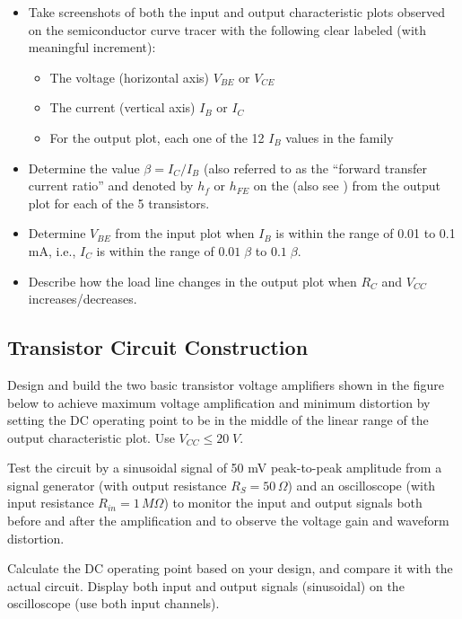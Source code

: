 \begin{itemize}
\item Take screenshots of both the input and output characteristic plots 
  observed on the semiconductor curve tracer with the following clear 
  labeled (with meaningful increment):
  \begin{itemize}
  \item The voltage (horizontal axis) $V_{BE}$ or $V_{CE}$
  \item The current (vertical axis) $I_B$ or $I_C$
  \item For the output plot, each one of the 12 $I_B$ values in the family
  \end{itemize}
\item Determine the value $\beta=I_C/I_B$ (also referred to as the 
  ``forward transfer current ratio'' and denoted by $h_f$ or $h_{FE}$ on
  the 
  (also see )
  from the output plot for each of the 5 transistors.
\item Determine $V_{BE}$ from the input plot when $I_B$ is within the range of
  0.01 to 0.1 mA, i.e., $I_C$ is within the range of $0.01\;\beta$ to $0.1\;\beta$.
\item Describe how the load line changes in the output plot when $R_C$ and $V_{CC}$
  increases/decreases.
\end{itemize}


\subsection{Transistor Circuit Construction}

Design and build the two basic transistor voltage amplifiers shown in the 
figure below to achieve maximum voltage amplification and minimum distortion 
by setting the DC operating point to be in the middle of the linear range of
the output characteristic plot. Use $V_{CC}\le 20\;V$. 

Test the circuit by a sinusoidal signal of 50 mV peak-to-peak amplitude from
a signal generator (with output resistance $R_S=50\,\Omega$) and an oscilloscope
(with input resistance $R_{in}=1\,M\Omega$) to monitor the input and output 
signals both before and after the amplification and to observe the voltage 
gain and waveform distortion. 

Calculate the DC operating point based on your design,
and compare it with the actual circuit. Display both input and output signals 
(sinusoidal) on the oscilloscope (use both input channels). 

